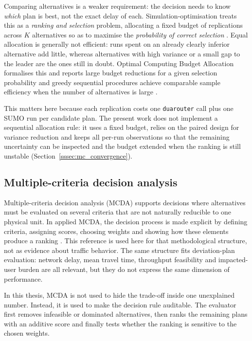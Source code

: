 Comparing alternatives is a weaker requirement: the decision needs to know \emph{which} plan is
best, not the exact delay of each. Simulation-optimisation treats this as a \emph{ranking and
selection} problem, allocating a fixed budget of replications across $K$ alternatives so as to
maximise the \emph{probability of correct selection} \cite{kim_nelson_selecting}. Equal allocation
is generally not efficient: runs spent on an already clearly inferior alternative add little,
whereas alternatives with high variance or a small gap to the leader are the ones still in doubt.
Optimal Computing Budget Allocation formalises this and reports large budget reductions for a given
selection probability \cite{chen2000_ocba} and greedy sequential procedures achieve comparable
sample efficiency when the number of alternatives is large \cite{li2023greedy}.

This matters here because each replication costs one \texttt{duarouter} call plus one SUMO run per
candidate plan. The present work does not implement a sequential allocation rule: it uses a fixed
budget, relies on the paired design for variance reduction and keeps all per-run observations so
that the remaining uncertainty can be inspected and the budget extended when the ranking is still
unstable (Section~\ref{sssec:mc_convergence}).


\subsection{Multiple-criteria decision analysis}

Multiple-criteria decision analysis (MCDA) supports decisions where alternatives must be evaluated
on several criteria that are not naturally reducible to one physical unit. In applied MCDA, the
decision process is made explicit by defining criteria, assigning scores, choosing weights and
showing how these elements produce a ranking \cite{mcda_manual}. This reference is used here for
that methodological structure, not as evidence about traffic behavior. The same structure fits
deviation-plan evaluation: network delay, mean travel time,
throughput feasibility and impacted-user burden are all relevant, but they do not express the same
dimension of performance.

In this thesis, MCDA is not used to hide the trade-off inside one unexplained number. Instead, it is
used to make the decision rule auditable. The evaluator first removes infeasible or dominated
alternatives, then ranks the remaining plans with an additive score and finally tests whether the
ranking is sensitive to the chosen weights.


